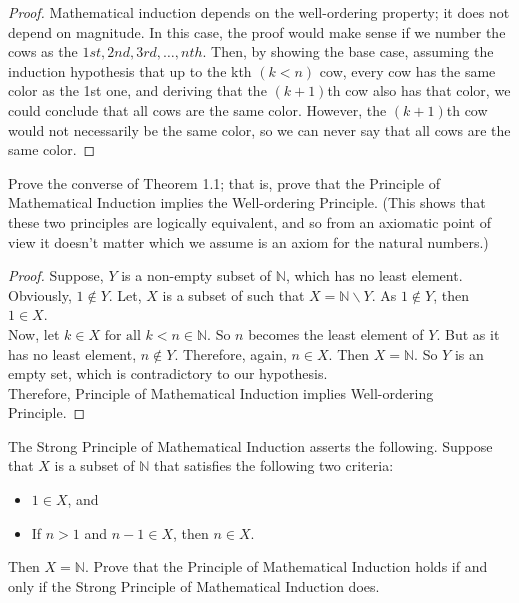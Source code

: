 \documentclass[12pt]{article}
\newenvironment{problem}[2][Problem]{\begin{trivlist}
\item[\hskip \labelsep {\bfseries #1}\hskip \labelsep {\bfseries #2.}]}{\end{trivlist}}
\begin{document}
\begin{proof}
Mathematical induction depends on the well-ordering property; it does not depend on magnitude.  
In this case, the proof would make sense if we number the cows as the $1st, 2nd, 3rd, \dots, nth$. Then, by showing the base case, assuming the induction hypothesis that up to the kth $(k < n)$ cow, every cow has the same color as the 1st one, and deriving that the $(k+1)$th cow also has that color, we could conclude that all cows are the same color. However, the $(k+1)$th cow would not necessarily be the same color, so we can never say that all cows are the same color.

\end{proof}

\begin{problem}{16}
Prove the converse of Theorem 1.1; that is, prove that the Principle of Mathematical Induction implies the Well-ordering Principle. (This shows that these two principles are logically equivalent, and so from an axiomatic point of view it doesn't matter which we assume is an axiom for the natural numbers.)

\end{problem}

\begin{proof}
Suppose, $Y$ is a non-empty subset of $\mathbb{N}$, which has no least element. Obviously, $1 \not \in Y$. Let, $X$ is a subset of such that $X = \mathbb{N}\backslash Y$. As $1 \not \in Y$, then $1 \in X.$ \\
Now, let $k \in X \text{ for all } k < n \in \mathbb{N}$. So $n$ becomes the least element of $Y$. But as it has no least element, $n \not \in Y$. Therefore, again, $n \in X$. Then $X = \mathbb{N}$. So $Y$ is an empty set, which is contradictory to our hypothesis.\\
Therefore, Principle of Mathematical Induction implies Well-ordering Principle.

\end{proof}

\begin{problem}{17}
The Strong Principle of Mathematical Induction asserts the following. Suppose that
\( X \) is a subset of \( \mathbb{N} \) that satisfies the following two criteria:
\begin{itemize}
    \item[(a)] \( 1 \in X \), and
    \item[(b)] If \( n > 1 \) and \( n - 1 \in X \), then \( n \in X \).
\end{itemize}
Then \( X = \mathbb{N} \). Prove that the Principle of Mathematical Induction holds if and only if
the Strong Principle of Mathematical Induction does.

\end{problem}
\end{document}
